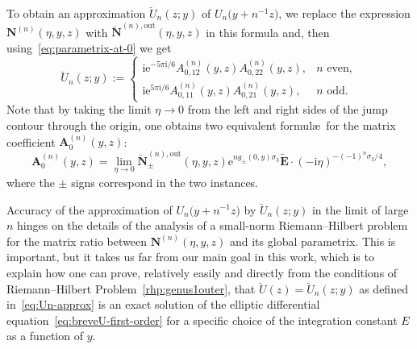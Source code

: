 \documentclass[11pt]{article}
\numberwithin{equation}{section}
\numberwithin{equation}{section}
\begin{document}
To obtain an approximation $\breve{U}_n(z;y)$ of $U_n\bigl(y+n^{-1}z\bigr)$, we replace
the expression $\mathbf{N}^{(n)}(\eta,y,z)$ with $\breve{\mathbf{N}}^{(n),\mathrm{out}}(\eta,y,z)$ in this formula and, then using~\eqref{eq:parametrix-at-0} we get
\begin{equation}
\breve{U}_n(z;y):=\begin{cases}\mathrm{i}\mathrm{e}^{-5\pi\mathrm{i}/6}A^{(n)}_{0,12}(y,z)A^{(n)}_{0,22}(y,z),&\text{$n$ even},\\\mathrm{i}\mathrm{e}^{5\pi\mathrm{i}/6}A^{(n)}_{0,11}(y,z)A^{(n)}_{0,21}(y,z),&\text{$n$ odd}.\end{cases}
\label{eq:Un-approx}
\end{equation}
Note that by taking the limit $\eta\to 0$ from the left and right sides of the jump contour through the origin, one obtains two equivalent formul\ae\ for the matrix coefficient $\mathbf{A}^{(n)}_0(y,z)$:
\begin{equation*}
\mathbf{A}^{(n)}_0(y,z)=\lim_{\eta\to 0}\breve{\mathbf{N}}^{(n),\mathrm{out}}_\pm(\eta,y,z)\mathrm{e}^{ng_\pm(0,y)\sigma_3}\widetilde{\mathbf{E}}\cdot (-\mathrm{i}\eta)^{-(-1)^n\sigma_3/4},
\end{equation*}
where the $\pm$ signs correspond in the two instances.

Accuracy of the approximation of $U_n\bigl(y+n^{-1}z\bigr)$ by $\breve{U}_n(z;y)$ in the limit of large $n$ hinges on the details of the analysis of a small-norm Riemann--Hilbert problem for the matrix ratio between $\mathbf{N}^{(n)}(\eta,y,z)$ and its global parametrix. This is important, but it takes us far from our main goal in this work, which is to explain how one can prove, relatively easily and directly from the conditions of Riemann--Hilbert Problem~\ref{rhp:genus1outer}, that $\breve{U}(z)=\breve{U}_n(z;y)$ as defined in~\eqref{eq:Un-approx} is an exact solution of the elliptic differential equation~\eqref{eq:breveU-first-order} for a specific choice of the integration constant $E$ as a function of $y$.
\end{document}
